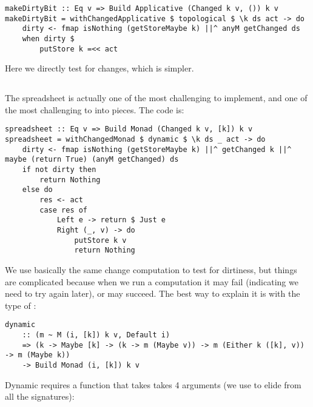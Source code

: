 \begin{verbatim}
makeDirtyBit :: Eq v => Build Applicative (Changed k v, ()) k v
makeDirtyBit = withChangedApplicative $ topological $ \k ds act -> do
    dirty <- fmap isNothing (getStoreMaybe k) ||^ anyM getChanged ds
    when dirty $
        putStore k =<< act
\end{verbatim}

Here we directly test for changes, which is simpler.

\subsection{\Excel}\label{sec-implementation-excel}

The spreadsheet is actually one of the most challenging to implement, and one of the most challenging to into pieces. The code is:

\begin{verbatim}
spreadsheet :: Eq v => Build Monad (Changed k v, [k]) k v
spreadsheet = withChangedMonad $ dynamic $ \k ds _ act -> do
    dirty <- fmap isNothing (getStoreMaybe k) ||^ getChanged k ||^ maybe (return True) (anyM getChanged) ds
    if not dirty then
        return Nothing
    else do
        res <- act
        case res of
            Left e -> return $ Just e
            Right (_, v) -> do
                putStore k v
                return Nothing
\end{verbatim}

We use basically the same change computation to test for dirtiness, but things are complicated because when we run a computation it may fail (indicating we need to try again later), or may succeed. The best way to explain it is with the type of :

\begin{verbatim}
dynamic
    :: (m ~ M (i, [k]) k v, Default i)
    => (k -> Maybe [k] -> (k -> m (Maybe v)) -> m (Either k ([k], v)) -> m (Maybe k))
    -> Build Monad (i, [k]) k v
\end{verbatim}

Dynamic requires a function that takes takes 4 arguments (we use  to elide  from all the signatures):

